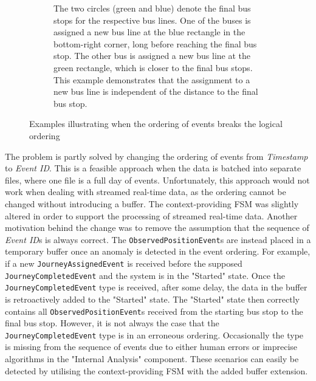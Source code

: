 \begin{figure}[h!]
\begin{subfigure}[t]{0.6\textwidth}
        \caption[]
        {\small The two circles (green and blue) denote the final bus stops for the respective bus lines.
        One of the buses is assigned a new bus line at the blue rectangle in the bottom-right corner, long before reaching the final bus stop.
        The other bus is assigned a new bus line at the green rectangle, which is closer to the final bus stops.
        This example demonstrates that the assignment to a new bus line is independent of the distance to the final bus stop.}
        \label{fig:assigned-before-completed}
    \end{subfigure}
    \caption[Examples of early stopping in a journey]
    {\small Examples illustrating when the ordering of events breaks the logical ordering}
    \label{fig:illogical-ordering}
\end{figure}

The problem is partly solved by changing the ordering of events from \textit{Timestamp} to \textit{Event ID}.
This is a feasible approach when the data is batched into separate files, where one file is a full day of events.
Unfortunately, this approach would not work when dealing with streamed real-time data, as the ordering cannot be changed without introducing a buffer.
The context-providing FSM was slightly altered in order to support the processing of streamed real-time data.
Another motivation behind the change was to remove the assumption that the sequence of \textit{Event ID}s is always correct. 
The \texttt{ObservedPositionEvent}s are instead placed in a temporary buffer once an anomaly is detected in the event ordering.
For example, if a new \texttt{JourneyAssignedEvent} is received before the supposed \texttt{JourneyCompletedEvent} and the system is in the "Started" state.
Once the \texttt{JourneyCompletedEvent} type is received, after some delay, the data in the buffer is retroactively added to the "Started" state.
The "Started" state then correctly contains all \texttt{ObservedPositionEvent}s received from the starting bus stop to the final bus stop.
However, it is not always the case that the \texttt{JourneyCompletedEvent} type is in an erroneous ordering.
Occasionally the type is missing from the sequence of events due to either human errors or imprecise algorithms in the "Internal Analysis" component.
These scenarios can easily be detected by utilising the context-providing FSM with the added buffer extension.

